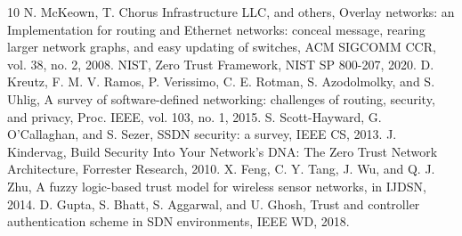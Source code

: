\documentclass[conference]{IEEEtran}
\begin{document}
\begin{thebibliography}{10}
 N. McKeown, T. Chorus Infrastructure LLC, and others, Overlay networks: an Implementation for routing and Ethernet networks: conceal message, rearing larger network graphs, and easy updating of switches, ACM SIGCOMM CCR, vol. 38, no. 2, 2008.
 NIST, Zero Trust Framework, NIST SP 800-207, 2020.
 D. Kreutz, F. M. V. Ramos, P. Verissimo, C. E. Rotman, S. Azodolmolky, and S. Uhlig, A survey of software-defined networking: challenges of routing, security, and privacy, Proc. IEEE, vol. 103, no. 1, 2015.
 S. Scott-Hayward, G. O'Callaghan, and S. Sezer, SSDN security: a survey, IEEE CS, 2013.
 J. Kindervag, Build Security Into Your Network’s DNA: The Zero Trust Network Architecture, Forrester Research, 2010.
 X. Feng, C. Y. Tang, J. Wu, and Q. J. Zhu, A fuzzy logic-based trust model for wireless sensor networks, in IJDSN, 2014.
 D. Gupta, S. Bhatt, S. Aggarwal, and U. Ghosh, Trust and controller authentication scheme in SDN environments, IEEE WD, 2018.
\end{thebibliography}
\end{document}
